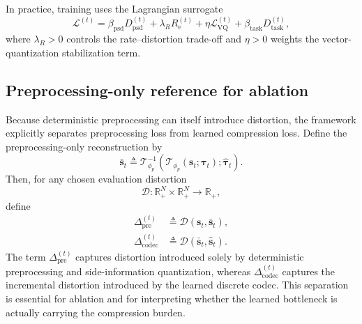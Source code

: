 \documentclass[11pt]{article}
\begin{document}
In practice, training uses the Lagrangian surrogate
\begin{equation}
\mathcal{L}^{(t)}
=
\beta_{\mathrm{psd}}D_{\mathrm{psd}}^{(t)}
+
\lambda_{R}R_{\mathrm{e}}^{(t)}
+
\eta \mathcal{L}_{\mathrm{VQ}}^{(t)}
+
\beta_{\mathrm{task}}D_{\mathrm{task}}^{(t)},
\end{equation}
where $\lambda_{R} > 0$ controls the rate--distortion trade-off and $\eta > 0$ weights the
vector-quantization stabilization term.

\subsection{Preprocessing-only reference for ablation}
Because deterministic preprocessing can itself introduce distortion, the framework explicitly
separates preprocessing loss from learned compression loss. Define the preprocessing-only
reconstruction by
\begin{equation}
\bar{\mathbf{s}}_t
\triangleq
\mathcal{T}_{\phi_p}^{-1}
\!\left(
\mathcal{T}_{\phi_p}(\mathbf{s}_t;\boldsymbol{\tau}_t);
\hat{\boldsymbol{\tau}}_t
\right).
\end{equation}
Then, for any chosen evaluation distortion
\begin{equation}
\mathscr{D} : \mathbb{R}_{+}^{N} \times \mathbb{R}_{+}^{N} \to \mathbb{R}_{+},
\end{equation}
define
\begin{align}
\Delta_{\mathrm{pre}}^{(t)}
&\triangleq
\mathscr{D}(\mathbf{s}_t,\bar{\mathbf{s}}_t), \\
\Delta_{\mathrm{codec}}^{(t)}
&\triangleq
\mathscr{D}(\bar{\mathbf{s}}_t,\hat{\mathbf{s}}_t).
\end{align}
The term $\Delta_{\mathrm{pre}}^{(t)}$ captures distortion introduced solely by deterministic
preprocessing and side-information quantization, whereas
$\Delta_{\mathrm{codec}}^{(t)}$ captures the incremental distortion introduced by the learned
discrete codec. This separation is essential for ablation and for interpreting whether the learned
bottleneck is actually carrying the compression burden.
\end{document}
